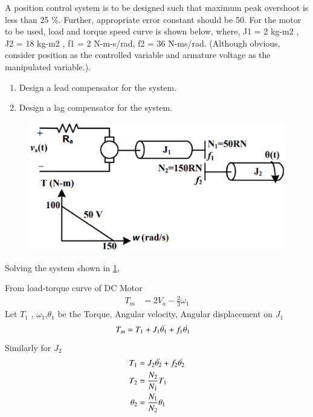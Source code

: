 \item A position control system is to be designed such that maximum peak overshoot is less than 25 \%.
Further, appropriate error constant should be 50. For the motor to be used, load and torque
speed curve is shown below, where, J1 = 2 kg-m2
, J2 = 18 kg-m2
, f1 = 2 N-m-s/rad, f2 = 36 N-ms/rad. (Although obvious, consider position as the controlled variable and armature voltage as
the manipulated variable.). 
\begin{enumerate}[label=(\roman*)]
\item Design a lead compensator for the system.
\item Design a lag compensator for the system.
\end{enumerate}

\begin{figure}[!ht]
\centering
    \includegraphics[width=\columnwidth]{./figs/ee18btech11001/ee18btech11001_1.eps}
  \caption{}
  \label{fig:ee18btech11001_fig1}
\end{figure}
%
\solution
Solving the system shown in \ref{fig:ee18btech11001_fig1},

From load-torque curve of DC Motor
\begin{align}
   T_{m} &=  2V_{a} - \frac{2}{3}\omega_{1}
    \label{eq:ee18btech11001_1}
\end{align}
Let $T_{1}$ , $\omega_{1}$,$\theta_1{}$  be the Torque, Angular velocity, Angular displacement on $J_{1}$
\begin{align}
    T_{m} &= T_{1} + J_{1}\Ddot{\theta_{1}} + f_{1}\Dot{\theta_{1}} 
    \label{eq:ee18btech11001_2}
\end{align}
Similarly for $J_{2}$
\begin{align}
    T_{1} &=  J_{2}\Ddot{\theta_{2}} + f_{2}\Dot{\theta_{2}} 
    \label{eq:ee18btech11001_3}
    \\
    T_{2} &= \frac{N_{2}}{N_{1}} T_{1} \label{eq:ee18btech11001_4}
    \\
    \theta_{2} &= \frac{N_{1}}{N_{2}} \theta_{1} \label{eq:ee18btech11001_5}
\end{align}
    



